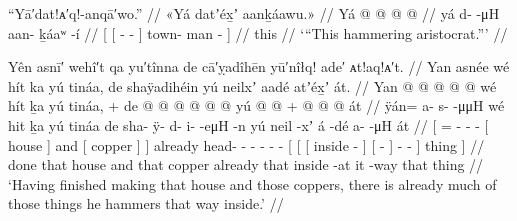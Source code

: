 \ex\label{ex:89-146-hammering-aristocrat}%
%
\begingl
	\glpreamble	“Yā′dat!ᴀ′q!-anqā′wo.” //
	\glpreamble	«\!Yá datʼéx̱ʼ aanḵáawu.\!» //
	\gla	{} Yá {}  @ {} @ {} {}
			 @ {} @ {} {} //
	\glb	{} yá {} d-  -μH {}
			aan- ḵáaʷ -í {} //
	\glc	{}[  {}[ -  - {}]
			town- man - {}] //
	\gld	{} this {}  {} {} {}
			 {} {} {} //
	\glft	‘“This hammering aristocrat.”’
		//
\endgl
\xe

\ex\label{ex:89-147-having-finished-many-pounded-things-inside}%
%
\begingl
	\glpreamble	Yên asnī′ wehî′t qa yu′tînna de cā′ỵadîhēn yū′nîłq! ade′ ᴀt!aq!ᴀ′t. //
	\glpreamble	Yan asnée wé hít ka yú tináa, de shaÿadihéin yú neilxʼ aadé atʼéx̱ʼ át. //
	\gla	{} Yan @  @ {} @ {} @ {} @ {}
			{} wé hít {} ḵa {} yú tináa, {} {} +
		de  @ {} @ {} @ {} @ {} @ {} @ {}
		{} yú {} {}  @ {} {}
				{}  @ {} {} +
				 @ {} @ {} @ {} {} át {} //
	\glb	{} ÿán= a- {} s-  -μμH
			{} wé hit {} ḵa {} yú tináa {} {}
		de sha- ÿ- d- i-  -eμH -n
		{} yú {} {} neil -xʼ {}
				{} á -dé {} 
				a-  -μH {} {} át {} //
	\glc	{}[ = - \· -  -
			{}[  house {}] and {}[  copper {}] {}]
		already head- - - -  - -
		{}[  {}[ {}[ inside - {}]
				{}[  - {}]
				-  - \· {}] thing {}] //
	\gld	{} done  {} {} {} {}
			{} that house {} and {} that copper {} {}
		already  {} {} {} {} {} {} 
		{} that {} {} inside -at {}
				{} it -way {} 
				 {} {} \·that {} thing {} //
	\glft	‘Having finished making that house and those coppers, there is already much of those things he hammers that way inside.’
		//
\endgl
\xe

